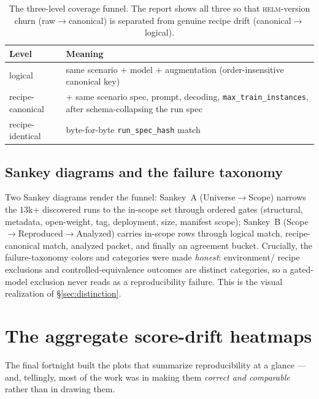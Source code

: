 \documentclass[11pt]{report}
\newcommand{\code}[1]{\texttt{#1}}
\begin{document}
\begin{table}[H]
\centering
\small
\begin{tabularx}{\textwidth}{lY}
\toprule
\textbf{Level} & \textbf{Meaning} \\
\midrule
logical           & same scenario + model + augmentation (order-insensitive canonical key) \\
recipe-canonical  & + same scenario spec, prompt, decoding, \code{max\_train\_instances}, after schema-collapsing the run spec \\
recipe-identical  & byte-for-byte \code{run\_spec\_hash} match \\
\bottomrule
\end{tabularx}
\caption{The three-level coverage funnel. The report shows all three so that
\textsc{helm}-version churn (raw$\to$canonical) is separated from genuine recipe
drift (canonical$\to$logical).}
\label{tab:funnel}
\end{table}

\subsection{Sankey diagrams and the failure taxonomy}

Two Sankey diagrams render the funnel: Sankey~A (Universe$\to$Scope) narrows the
$13$k+ discovered runs to the in-scope set through ordered gates (structural,
metadata, open-weight, tag, deployment, size, manifest scope); Sankey~B
(Scope$\to$Reproduced$\to$Analyzed) carries in-scope rows through logical match,
recipe-canonical match, analyzed packet, and finally an agreement bucket. Crucially,
the failure-taxonomy colors and categories were made \emph{honest}: environment/
recipe exclusions and controlled-equivalence outcomes are distinct categories, so a
gated-model exclusion never reads as a reproducibility failure. This is the visual
realization of \S\ref{sec:distinction}.

\section{The aggregate score-drift heatmaps}

The final fortnight built the plots that summarize reproducibility at a glance ---
and, tellingly, most of the work was in making them \emph{correct and comparable}
rather than in drawing them.
\end{document}
